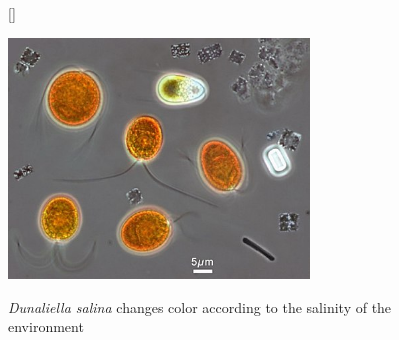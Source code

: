 \begin{description}
 \begin{figure}[!htbp]
[\FBwidth]
{\caption{\textit{Dunaliella salina} changes color according to the salinity of the environment}
\label{fig:ch2alg05}}
{\includegraphics[width=8cm]{images/chap2/chap2_alg_05.png}}
\end{figure}
\FloatBarrier
\end{description}